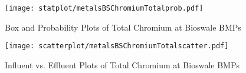         \begin{figure}[hb]   %
            \centering
            \texttt{[image: statplot/metalsBSChromiumTotalprob.pdf]}
            \caption{Box and Probability Plots of Total Chromium at Bioswale BMPs}
        \end{figure}         %
        
        
        \begin{figure}[hb]   %
            \centering
            \texttt{[image: scatterplot/metalsBSChromiumTotalscatter.pdf]}
            \caption{Influent vs. Effluent Plots of Total Chromium at Bioswale BMPs}
        \end{figure}         %
        \clearpage
        